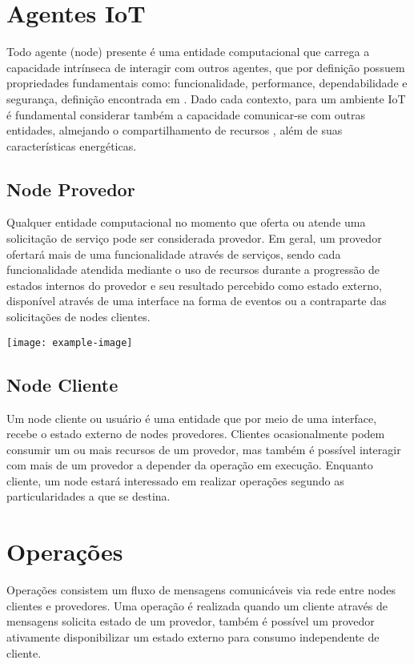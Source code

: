 \section{Agentes \acs{IoT}}
Todo agente (node) presente é uma entidade computacional que carrega a capacidade intrínseca de interagir com outros agentes, que por definição possuem propriedades fundamentais como: funcionalidade, performance, dependabilidade e segurança, definição encontrada em \cite{avizienis_basic_2004}. Dado cada contexto, para um ambiente IoT é fundamental considerar também a capacidade comunicar-se com outras entidades, almejando o compartilhamento de recursos \cite{li_internet_2015}, além de suas características energéticas. 


\subsection{Node Provedor}
Qualquer entidade computacional no momento que oferta ou atende uma solicitação de serviço pode ser considerada provedor. Em geral, um provedor ofertará mais de uma funcionalidade através de serviços, sendo cada funcionalidade atendida mediante o uso de recursos durante a progressão de estados internos do provedor e seu resultado percebido como estado externo, disponível através de uma interface na forma de eventos ou a contraparte das solicitações de nodes clientes.

\noindent\texttt{[image: example-image]} 

\subsection{Node Cliente}
Um node cliente ou usuário é uma entidade que por meio de uma interface, recebe o estado externo de nodes provedores. Clientes ocasionalmente podem consumir um ou mais recursos de um provedor, mas também é possível interagir com mais de um provedor a depender da operação em execução. Enquanto cliente, um node estará interessado em realizar operações segundo as particularidades a que se destina.

\section{Operações}
Operações consistem um fluxo de mensagens comunicáveis via rede entre nodes clientes e provedores. Uma operação é realizada quando um cliente através de mensagens solicita estado de um provedor, também é possível um provedor ativamente disponibilizar um estado externo para consumo independente de cliente. 

